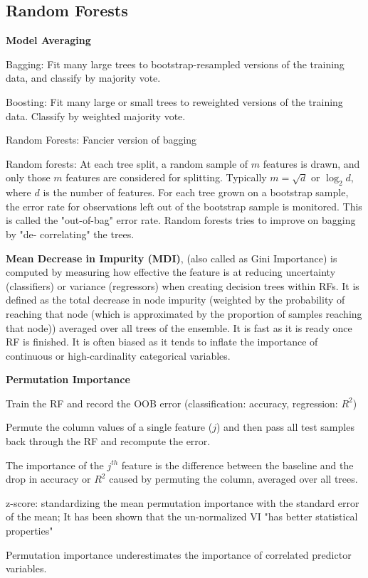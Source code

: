 \documentclass[12pt]{article}
\begin{document}
\subsection{Random Forests}
\textbf{Model Averaging}
\ulb
\item Bagging: Fit many large trees to bootstrap-resampled versions of the training data, and classify by majority vote.
\item Boosting: Fit many large or small trees to reweighted versions of the training data. Classify by weighted majority vote.
\item  Random Forests: Fancier version of bagging
\ule
\par Random forests: At each tree split, a random sample of $m$ features is drawn, and only those $m$ features are considered for splitting. Typically $m = \sqrt{d}$ or $\log_2 d$, where $d$ is the number of features. For each tree grown on a bootstrap sample, the error rate for observations left out of the bootstrap sample is monitored. This is called the "out-of-bag" error rate. Random forests tries to improve on bagging by "de- correlating" the trees.
\par \textbf{Mean Decrease in Impurity (MDI)}, (also called as Gini Importance) is computed by measuring how effective the feature is at reducing uncertainty (classifiers) or variance (regressors) when creating decision trees within RFs. It is defined as the total decrease in node impurity (weighted by the probability of reaching that node (which is approximated by the proportion of samples reaching that node)) averaged over all trees of the ensemble. It is fast as it is ready once RF is finished. It is often biased as it tends to inflate the importance of continuous or high-cardinality categorical variables.
\par \textbf{Permutation Importance}
\ulb
\item Train the RF and record the OOB error (classification: accuracy, regression: $R^2$)
\item Permute the column values of a single feature ($j$) and then pass all test samples back through the RF and recompute the error.
\item The importance of the $j^{th}$ feature is the difference between the baseline and the drop in accuracy or $R^2$ caused by permuting the column, averaged over all trees.
\item z-score: standardizing the mean permutation importance with the standard error of the mean; It has been shown that the un-normalized VI "has better statistical properties"
\item Permutation importance underestimates the importance of correlated predictor variables.
\ule
\end{document}

